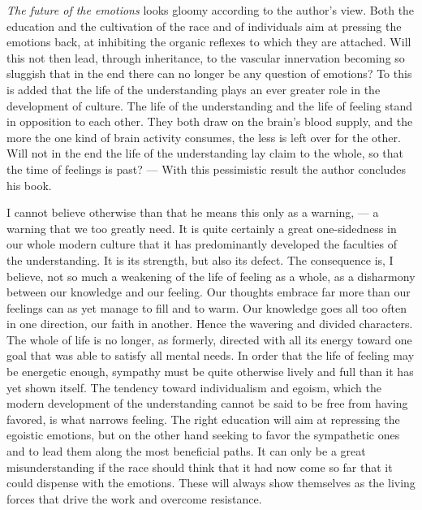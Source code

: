 \documentclass[12pt,a4paper,openany]{book}
\newcommand{\opage}[1]{\marginnote{\footnotesize\textit{[#1]}}}
\begin{document}
\emph{The future of the emotions} looks gloomy according to the author's view.
Both the education and the cultivation of the race and of individuals
aim at pressing the emotions back, at inhibiting the organic reflexes
to which they are attached. Will this not then lead, through inheritance, to the
vascular innervation becoming so sluggish that in the end there can no longer
be any question of emotions? To this is added that the life of the understanding
plays an ever greater role in the development of culture.
The life of the understanding and the life of feeling stand in opposition to each other.
They both draw on the brain's blood supply, and the more
the one kind of brain activity consumes, the less
is left over for the other. Will not in the end
the life of the understanding lay claim to the whole, so that the
time of feelings is past? --- With this pessimistic result the
author concludes his book.

I cannot believe otherwise than that he means this only
as a warning, --- a warning that we too greatly
need. It is quite certainly a great one-sidedness in our whole
modern culture that it has predominantly developed the
faculties of the understanding. It is its strength, but also its defect.
The consequence is, I believe, not so much a weakening
of the life of feeling as a whole, as a disharmony between our
knowledge and our feeling. Our thoughts embrace far more
than our feelings can as yet manage to fill and to warm. Our
knowledge goes all too often in one direction, our faith in another.
\opage{60}Hence the wavering and divided characters. The whole of life is no
longer, as formerly, directed with all its energy toward one goal
that was able to satisfy all mental needs.
In order that the life of feeling may be energetic enough, sympathy must
be quite otherwise lively and full than it has
yet shown itself. The tendency toward individualism and egoism, which
the modern development of the understanding cannot be said to be free from
having favored, is what narrows feeling. The right
education will aim at repressing the egoistic
emotions, but on the other hand seeking to favor the sympathetic ones
and to lead them along the most beneficial paths. It can only be a
great misunderstanding if the race should think that it had now
come so far that it could dispense with the emotions.
These will always show themselves as the living forces that drive
the work and overcome resistance.
\end{document}
